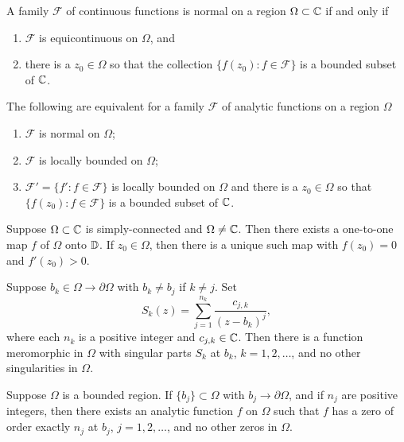 \documentclass[12pt]{article}
\begin{document}
\begin{theorem}
    A family $\mathcal{F}$ of continuous functions is normal on a region $\Omega\subset\mathbb{C}$ if and only if
    \begin{enumerate}[label=(\roman*)]
        \item $\mathcal{F}$ is equicontinuous on $\Omega$, and
        \item there is a $z_0\in \Omega$ so that the collection $\{f(z_0):f\in\mathcal{F}\}$ is a bounded subset of $\mathbb{C}$.
    \end{enumerate}
\end{theorem}

\begin{theorem}
    The following are equivalent for a family $\mathcal{F}$ of analytic functions on a region $\Omega$
    \begin{enumerate}[label=(\roman*)]
        \item $\mathcal{F}$ is normal on $\Omega$;
        \item $\mathcal{F}$ is locally bounded on $\Omega$;
        \item $\mathcal{F}'=\{f':f\in\mathcal{F}\}$ is locally bounded on $\Omega$ and there is a $z_0\in\Omega$ so that $\{f(z_0):f\in\mathcal{F}\}$ is a bounded subset of $\mathbb{C}$. 
    \end{enumerate}
\end{theorem}

\begin{theorem}
    Suppose $\Omega\subset\mathbb{C}$ is simply-connected and $\Omega\neq\mathbb{C}$. Then there exists a one-to-one map $f$ of $\Omega$ onto $\mathbb{D}$. If $z_0\in\Omega$, then there is a unique such map with $f(z_0)=0$ and $f'(z_0)>0$.
\end{theorem}

\begin{theorem}
    Suppose $b_k\in\Omega\to\partial\Omega$ with $b_k\neq b_j$ if $k\neq j$. Set 
    \begin{equation*}
        S_k(z)=\sum_{j=1}^{n_k}\frac{c_{j,k}}{(z-b_k)^j},
    \end{equation*}
    where each $n_k$ is a positive integer and $c_{j,k}\in\mathbb{C}$. Then there is a function meromorphic in $\Omega$ with singular parts $S_k$ at $b_k$, $k=1,2,\dots$, and no other singularities in $\Omega$. 
\end{theorem}

\begin{theorem}
    Suppose $\Omega$ is a bounded region. If $\{b_j\}\subset\Omega$ with $b_j\to\partial\Omega$, and if $n_j$ are positive integers, then there exists an analytic function $f$ on $\Omega$ such that $f$ has a zero of order exactly $n_j$ at $b_j$, $j=1,2,\dots$, and no other zeros in $\Omega$.
\end{theorem}
\end{document}
